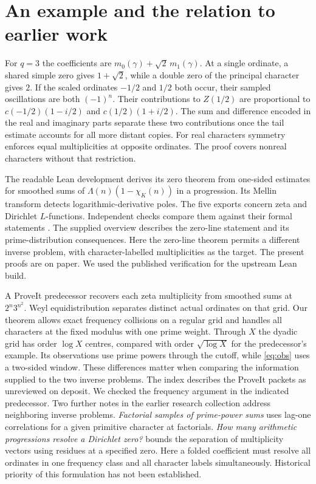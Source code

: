 \documentclass[11pt]{article}
\begin{document}
\section{An example and the relation to earlier work}
For $q=3$ the coefficients are $m_0(\gamma)+\sqrt2\,m_1(\gamma)$. At a single ordinate, a shared simple zero gives $1+\sqrt2$, while a double zero of the principal character gives $2$. If the scaled ordinates $-1/2$ and $1/2$ both occur, their sampled oscillations are both $(-1)^n$. Their contributions to $Z(1/2)$ are proportional to $c(-1/2)(1-i/2)$ and $c(1/2)(1+i/2)$. The sum and difference encoded in the real and imaginary parts separate these two contributions once the tail estimate accounts for all more distant copies. For real characters symmetry enforces equal multiplicities at opposite ordinates. The proof covers nonreal characters without that restriction.

The readable Lean development \cite{lean} derives its zero theorem from one-sided estimates for smoothed sums of $\Lambda(n)(1-\chi_K(n))$ in a progression. Its Mellin transform detects logarithmic-derivative poles. The five exports concern zeta and Dirichlet $L$-functions. Independent checks compare them against their formal statements \cite{audit}. The supplied overview \cite{wiki} describes the zero-line statement and its prime-distribution consequences. Here the zero-line theorem permits a different inverse problem, with character-labelled multiplicities as the target. The present proofs are on paper. We used the published verification for the upstream Lean build.

A ProveIt predecessor \cite{prior} recovers each zeta multiplicity from smoothed sums at $2^n3^{n^2}$. Weyl equidistribution separates distinct actual ordinates on that grid. Our theorem allows exact frequency collisions on a regular grid and handles all characters at the fixed modulus with one prime weight. Through $X$ the dyadic grid has order $\log X$ centres, compared with order $\sqrt{\log X}$ for the predecessor's example. Its observations use prime powers through the cutoff, while \eqref{eq:obs} uses a two-sided window. These differences matter when comparing the information supplied to the two inverse problems. The index describes the ProveIt packets as unreviewed on deposit. We checked the frequency argument in the indicated predecessor. Two further notes in the earlier research collection address neighboring inverse problems. \emph{Factorial samples of prime-power sums} uses lag-one correlations for a given primitive character at factorials. \emph{How many arithmetic progressions resolve a Dirichlet zero?} bounds the separation of multiplicity vectors using residues at a specified zero. Here a folded coefficient must resolve all ordinates in one frequency class and all character labels simultaneously. Historical priority of this formulation has not been established.
\end{document}
